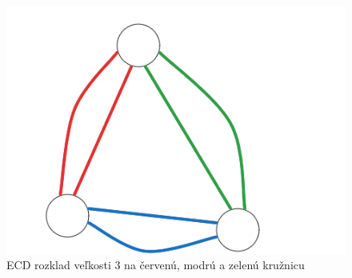 \documentclass[11pt]{article}
\begin{document}
\begin{figure}[h]
    \includegraphics[scale=0.4]{TexResources/2c3ecd}
    \centering
    \caption{ECD rozklad veľkosti 3 na červenú, modrú a zelenú kružnicu}
\end{figure}
\end{document}

